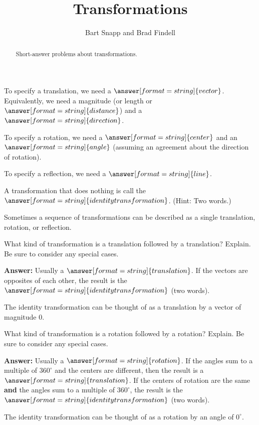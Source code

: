 \documentclass[nooutcomes]{ximera}
\title{Transformations}
\author{Bart Snapp and Brad Findell}
\begin{document}
\begin{abstract}
Short-answer problems about transformations. 
\end{abstract}
\maketitle


\begin{question}
To specify a translation, we need a $\answer[format=string]{vector}$.  Equivalently, we need a magnitude (or length or $\answer[format=string]{distance}$) and a $\answer[format=string]{direction}$.  
\end{question}

\begin{question}
To specify a rotation, we need a $\answer[format=string]{center}$ and an $\answer[format=string]{angle}$ (assuming an agreement about the direction of rotation).  
\end{question}

\begin{question}
To specify a reflection, we need a $\answer[format=string]{line}$.  
\end{question}

\begin{question}
A transformation that does nothing is call the $\answer[format=string]{identity transformation}$.  (Hint: Two words.)
\end{question}

Sometimes a sequence of transformations can be described as a single translation, rotation, or reflection.  

\begin{question}
What kind of transformation is a translation followed by a translation?  Explain.  Be sure to consider any special cases.  

\textbf{Answer:} Usually a $\answer[format=string]{translation}$.  If the vectors are opposites of each other, the result 
is the $\answer[format=string]{identity transformation}$ (two words).  
\begin{feedback}[correct]
The identity transformation can be thought of as a translation by a vector of magnitude $0$.
\end{feedback}
\end{question}

\begin{question}
What kind of transformation is a rotation followed by a rotation?  Explain.  Be sure to consider any special cases.   

\textbf{Answer:} Usually a $\answer[format=string]{rotation}$.  If the angles sum to a multiple of $360^\circ$ and the centers are different, then the result is a $\answer[format=string]{translation}$.  If the centers of rotation are the same \textbf{and} the angles sum to a multiple of $360^\circ$, the result is the $\answer[format=string]{identity transformation}$ (two words).  
\begin{feedback}[correct]
The identity transformation can be thought of as a rotation by an angle of $0^\circ$.
\end{feedback}
\end{question}
\end{document}
